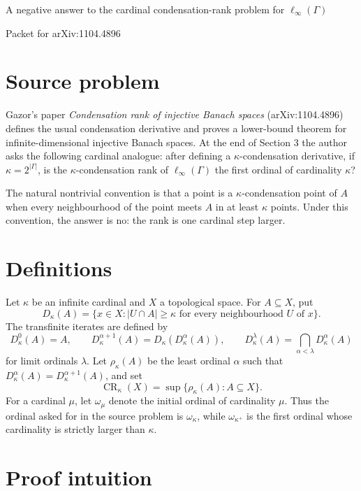 \documentclass[11pt]{article}
\newcommand{\card}[1]{\left|#1\right|}
\newcommand{\CR}{\operatorname{CR}}
\begin{document}
\begin{center}
{\Large A negative answer to the cardinal condensation-rank problem for
\(\ell_\infty(\Gamma)\)}

\vspace{0.4em}
{\large Packet for arXiv:1104.4896}
\end{center}

\section*{Source problem}

Gazor's paper \emph{Condensation rank of injective Banach spaces}
(arXiv:1104.4896) defines the usual condensation derivative and proves a
lower-bound theorem for infinite-dimensional injective Banach spaces.  At the
end of Section 3 the author asks the following cardinal analogue: after
defining a \(\kappa\)-condensation derivative, if
\(\kappa=2^{\card{\Gamma}}\), is the \(\kappa\)-condensation rank of
\(\ell_\infty(\Gamma)\) the first ordinal of cardinality \(\kappa\)?

The natural nontrivial convention is that a point is a
\(\kappa\)-condensation point of \(A\) when every neighbourhood of the point
meets \(A\) in at least \(\kappa\) points.  Under this convention, the answer
is no: the rank is one cardinal step larger.

\section*{Definitions}

Let \(\kappa\) be an infinite cardinal and \(X\) a topological space.  For
\(A\subseteq X\), put
\[
D_\kappa(A)=\{x\in X:\card{U\cap A}\geq \kappa
\text{ for every neighbourhood }U\text{ of }x\}.
\]
The transfinite iterates are defined by
\[
D_\kappa^0(A)=A,\qquad
D_\kappa^{\alpha+1}(A)=D_\kappa(D_\kappa^\alpha(A)),\qquad
D_\kappa^\lambda(A)=\bigcap_{\alpha<\lambda}D_\kappa^\alpha(A)
\]
for limit ordinals \(\lambda\).  Let \(\rho_\kappa(A)\) be the least ordinal
\(\alpha\) such that \(D_\kappa^\alpha(A)=D_\kappa^{\alpha+1}(A)\), and set
\[
\CR_\kappa(X)=\sup\{\rho_\kappa(A):A\subseteq X\}.
\]
For a cardinal \(\mu\), let \(\omega_\mu\) denote the initial ordinal of
cardinality \(\mu\).  Thus the ordinal asked for in the source problem is
\(\omega_\kappa\), while \(\omega_{\kappa^+}\) is the first ordinal whose
cardinality is strictly larger than \(\kappa\).

\section*{Proof intuition}
\end{document}
